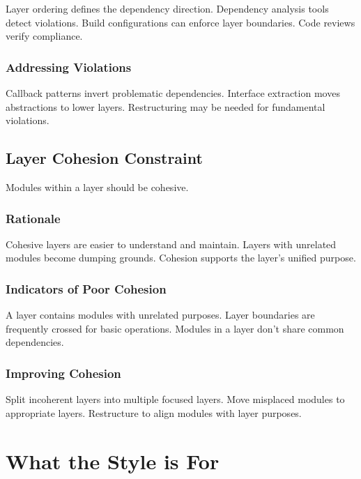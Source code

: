 \documentclass[11pt]{article}
\begin{document}
Layer ordering defines the dependency direction. Dependency analysis tools detect violations. Build configurations can enforce layer boundaries. Code reviews verify compliance.

\subsubsection{Addressing Violations}

Callback patterns invert problematic dependencies. Interface extraction moves abstractions to lower layers. Restructuring may be needed for fundamental violations.

\subsection{Layer Cohesion Constraint}

Modules within a layer should be cohesive.

\subsubsection{Rationale}

Cohesive layers are easier to understand and maintain. Layers with unrelated modules become dumping grounds. Cohesion supports the layer's unified purpose.

\subsubsection{Indicators of Poor Cohesion}

A layer contains modules with unrelated purposes. Layer boundaries are frequently crossed for basic operations. Modules in a layer don't share common dependencies.

\subsubsection{Improving Cohesion}

Split incoherent layers into multiple focused layers. Move misplaced modules to appropriate layers. Restructure to align modules with layer purposes.

\section{What the Style is For}
\end{document}
